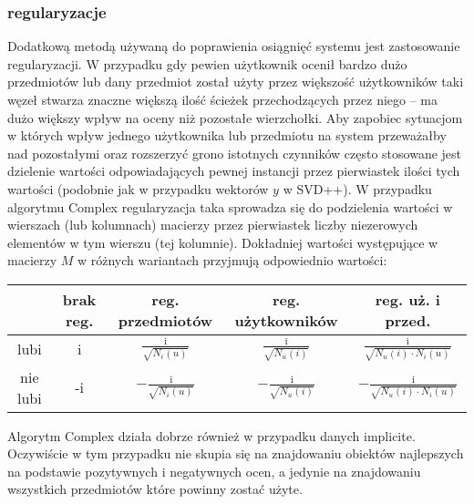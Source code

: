 \documentclass{pracamgr}
\begin{document}
    \subsubsection{regularyzacje}
     Dodatkową metodą używaną do poprawienia osiągnięć systemu jest zastosowanie regularyzacji.
     W przypadku gdy pewien użytkownik ocenił bardzo dużo przedmiotów lub dany przedmiot został użyty przez większość użytkowników taki węzeł
     stwarza znaczne większą ilość ścieżek przechodzących przez niego -- ma dużo większy wpływ na oceny niż pozostałe wierzchołki.
     Aby zapobiec sytuacjom w których wpływ jednego użytkownika lub przedmiotu na system przeważałby nad pozostałymi oraz rozszerzyć
     grono istotnych czynników często stosowane jest dzielenie wartości odpowiadających pewnej instancji przez pierwiastek ilości tych wartości
     (podobnie jak w przypadku wektorów $y$ w SVD++).
     W przypadku algorytmu Complex regularyzacja taka sprowadza się do podzielenia wartości w wierszach (lub kolumnach) macierzy przez pierwiastek liczby
     niezerowych elementów w tym wierszu (tej kolumnie). Dokładniej wartości występujące w macierzy $M$ w różnych wariantach przyjmują odpowiednio
     wartości:
     \begin{center}
      \begin{tabular}{|c|c|c|c|c|}
       \hline
         & brak reg. & reg. przedmiotów & reg. użytkowników & reg. uż. i przed. \\
       \hline
        lubi & i &  $\frac{\text{i}}{\sqrt{N_{i}(u)}}$& $\frac{\text{i}}{\sqrt{N_{u}(i)}}$ & $\frac{\text{i}}{\sqrt{N_{u}(i)\cdot N_{i}(u)}}$  \\
       \hline
        nie lubi & -i & $-\frac{\text{i}}{\sqrt{N_{i}(u)}}$ &  $-\frac{\text{i}}{\sqrt{N_{u}(i)}}$ & $-\frac{\text{i}}{\sqrt{N_{u}(i)\cdot N_{i}(u)}}$  \\    
       \hline
      \end{tabular}
     \end{center}
     \vspace{16pt}
     Algorytm Complex działa dobrze również w przypadku danych implicite. Oczywiście w tym przypadku nie skupia się na znajdowaniu obiektów najlepszych
     na podstawie pozytywnych i negatywnych ocen, a jedynie na znajdowaniu wszystkich przedmiotów które powinny zostać użyte.\newpage
    
\end{document}
